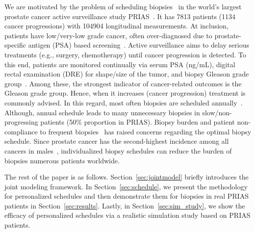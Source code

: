 We are motivated by the problem of scheduling biopsies~\citep{nieboer2018active} in the world's largest prostate cancer active surveillance study PRIAS~\citep{bokhorst2015compliance}. It has 7813 patients (1134 cancer progressions) with 104904 longitudinal measurements. At inclusion, patients have low/very-low grade cancer, often over-diagnosed due to prostate-specific antigen (PSA) based screening~\citep{crawford2003epidemiology}. Active surveillance aims to delay serious treatments (e.g., surgery, chemotherapy) until cancer progression is detected. To this end, patients are monitored continually via serum PSA (ng/mL), digital rectal examination (DRE) for shape/size of the tumor, and biopsy Gleason grade group~\citep{epsteinGG2014}. Among these, the strongest indicator of cancer-related outcomes is the Gleason grade group. Hence, when it increases (cancer progression) treatment is commonly advised. In this regard, most often biopsies are scheduled annually~\citep{loeb2014heterogeneity}. Although, annual schedule leads to many unnecessary biopsies in slow/non-progressing patients (50\% proportion in PRIAS). Biopsy burden and patient non-compliance to frequent biopsies~\citep{bokhorst2015compliance} has raised concerns regarding the optimal biopsy schedule. Since prostate cancer has the second-highest incidence among all cancers in males~\citep{GlobalCancerStats2012}, individualized biopsy schedules can reduce the burden of biopsies numerous patients worldwide.

The rest of the paper is as follows. Section~\ref{sec:jointmodel} briefly introduces the joint modeling framework. In Section~\ref{sec:schedule}, we present the methodology for personalized schedules and then demonstrate them for biopsies in real PRIAS patients in Section~\ref{sec:results}. Lastly, in Section~\ref{sec:sim_study}, we show the efficacy of personalized schedules via a realistic simulation study based on PRIAS patients.